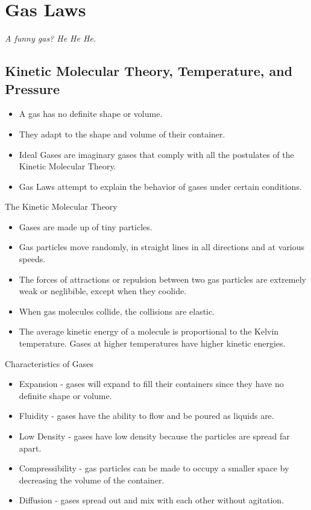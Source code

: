 \documentclass[../hchem.tex]{subfiles}
\begin{document}
\chapter{Gas Laws}
\textit{A funny gas? He He He.}

\section{Kinetic Molecular Theory, Temperature, and Pressure}
\begin{itemize}
    \item A gas has no definite shape or volume.
    \item They adapt to the shape and volume of their container.
    \item Ideal Gases are imaginary gases that comply with all the postulates of the Kinetic Molecular Theory.
    \item Gas Laws attempt to explain the behavior of gases under certain conditions.
\end{itemize}

The Kinetic Molecular Theory 
\begin{itemize}
    \item Gases are made up of tiny particles.
    \item Gas particles move randomly, in straight lines in all directions and at various speeds.
    \item The forces of attractions or repulsion between two gas particles are extremely weak or neglibible, except when they coolide.
    \item When gas molecules collide, the collisions are elastic.
    \item The average kinetic energy of a molecule is proportional to the Kelvin temperature. Gases at higher temperatures have higher kinetic energies.
\end{itemize}

Characteristics of Gases
\begin{itemize}
    \item Expansion - gases will expand to fill their containers since they have no definite shape or volume.
    \item Fluidity - gases have the ability to flow and be poured as liquids are.
    \item Low Density - gases have low density because the particles are spread far apart.
    \item Compressibility - gas particles can be made to occupy a smaller space by decreasing the volume of the container.
    \item Diffusion - gases spread out and mix with each other without agitation.
\end{itemize}
\end{document}
